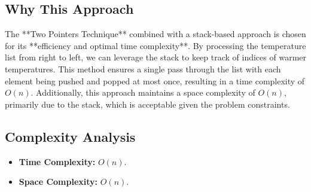 \subsection*{Why This Approach}

The **Two Pointers Technique** combined with a stack-based approach is chosen for its **efficiency and optimal time complexity**. By processing the temperature list from right to left, we can leverage the stack to keep track of indices of warmer temperatures. This method ensures a single pass through the list with each element being pushed and popped at most once, resulting in a time complexity of \( O(n) \). Additionally, this approach maintains a space complexity of \( O(n) \), primarily due to the stack, which is acceptable given the problem constraints.

\subsection*{Complexity Analysis}
\begin{itemize}
    \item \textbf{Time Complexity:} \( O(n) \).
    \item \textbf{Space Complexity:} \( O(n) \).
\end{itemize}

